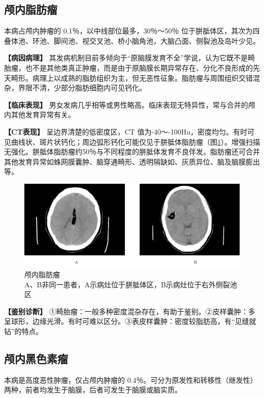 \subsection{颅内脂肪瘤}

本病占颅内肿瘤的 0.1％，以中线部位最多，30％～50％
位于胼胝体区，其次为四叠体池、环池、脚间池、视交叉池、桥小脑角池，大脑凸面、侧裂池及岛叶少见。

\textbf{【病因病理】}
其发病机制目前多倾向于“原脑膜发育不全”学说，认为它既不是畸胎瘤，也不是其他类真正肿瘤，而是由于原脑膜长期异常存在、分化不良形成的先天畸形。病理上以成熟的脂肪组织为主，但无恶性征象。脂肪瘤与周围组织交错混杂，界限不清，少部分脂肪细胞内可见钙化。

\textbf{【临床表现】}
男女发病几乎相等或男性略高。临床表现无特异性，常与合并的颅内其他发育异常有关。

\textbf{【CT表现】} 呈边界清楚的低密度区，CT
值为-40～-100Hu，密度均匀。有时可见曲线状、斑片状钙化；周边弧形钙化可能仅见于胼胝体脂肪瘤（图\ref{fig2-44}）。增强扫描无强化。胼胝体脂肪瘤约50％与不同程度的胼胝体发育不良伴发。脂肪瘤还可合并其他发育异常如蛛网膜囊肿、脑穿通畸形、透明隔缺如、灰质异位、脑及脑膜膨出等。

\begin{figure}[!htbp]
 \centering
 \includegraphics[width=.7\textwidth,height=\textheight,keepaspectratio]{./images/Image00073.jpg}
 \captionsetup{justification=centering}
 \caption{颅内脂肪瘤\\{\small A、B非同一患者，A示病灶位于胼胝体区，B示病灶位于右外侧裂池区}}
 \label{fig2-44}
  \end{figure} 

\textbf{【鉴别诊断】}
①畸胎瘤：一般多种密度混杂存在，有助于鉴别。②皮样囊肿：多呈球形，边缘光滑。有时可难以区分。③表皮样囊肿：密度较脂肪高，有“见缝就钻”的特点。

\subsection{颅内黑色素瘤}

本病是高度恶性肿瘤，仅占颅内肿瘤的
0.4％。可分为原发性和转移性（继发性）两种，前者均发生于脑膜，后者可发生于脑膜或脑实质。

